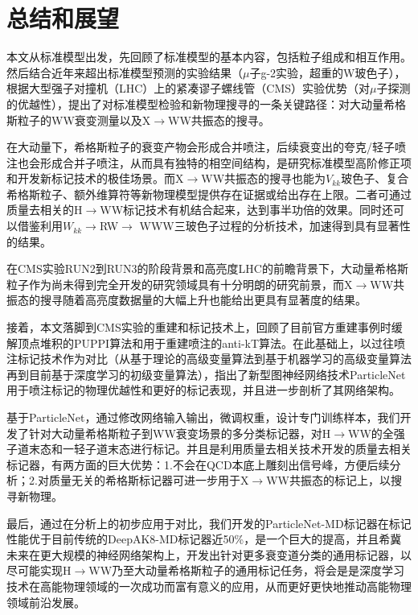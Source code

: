\chapter{总结和展望}
\fontsize{12bp}{14.4pt}

本文从标准模型出发，先回顾了标准模型的基本内容，包括粒子组成和相互作用。然后结合近年来超出标准模型预测的实验结果（$\mu$子g-2实验，超重的W玻色子），根据大型强子对撞机（LHC）上的紧凑谬子螺线管（CMS）实验优势（对$\mu$子探测的优越性），提出了对标准模型检验和新物理搜寻的一条关键路径：对大动量希格斯粒子的WW衰变测量以及X$\to$WW共振态的搜寻。

在大动量下，希格斯粒子的衰变产物会形成合并喷注，后续衰变出的夸克/轻子喷注也会形成合并子喷注，从而具有独特的相空间结构，是研究标准模型高阶修正项和开发新标记技术的极佳场景。而X$\to$WW共振态的搜寻也能为$V_{kk}$玻色子、复合希格斯粒子、额外维算符等新物理模型提供存在证据或给出存在上限。二者可通过质量去相关的H$\to$WW标记技术有机结合起来，达到事半功倍的效果。同时还可以借鉴利用$W_{kk}\to $RW$\to$ WWW三玻色子过程的分析技术，加速得到具有显著性的结果。

在CMS实验RUN2到RUN3的阶段背景和高亮度LHC的前瞻背景下，大动量希格斯粒子作为尚未得到完全开发的研究领域具有十分明朗的研究前景，而X$\to$WW共振态的搜寻随着高亮度数据量的大幅上升也能给出更具有显著度的结果。

接着，本文落脚到CMS实验的重建和标记技术上，回顾了目前官方重建事例时缓解顶点堆积的PUPPI算法和用于重建喷注的anti-kT算法。在此基础上，以过往喷注标记技术作为对比（从基于理论的高级变量算法到基于机器学习的高级变量算法再到目前基于深度学习的初级变量算法），指出了新型图神经网络技术ParticleNet用于喷注标记的物理优越性和更好的标记表现，并且进一步剖析了其网络架构。

基于ParticleNet，通过修改网络输入输出，微调权重，设计专门训练样本，我们开发了针对大动量希格斯粒子到WW衰变场景的多分类标记器，对H$\to$WW的全强子道末态和一轻子道末态进行标记。并且是利用质量去相关技术开发的质量去相关标记器，有两方面的巨大优势：1.不会在QCD本底上雕刻出信号峰，方便后续分析；2.对质量无关的希格斯标记器可进一步用于X$\to$WW共振态的标记上，以搜寻新物理。

最后，通过在分析上的初步应用于对比，我们开发的ParticleNet-MD标记器在标记性能优于目前传统的DeepAK8-MD标记器近50\%，是一个巨大的提高，并且希冀未来在更大规模的神经网络架构上，开发出针对更多衰变道分类的通用标记器，以尽可能实现H$\to$WW乃至大动量希格斯粒子的通用标记任务，将会是是深度学习技术在高能物理领域的一次成功而富有意义的应用，从而更好更快地推动高能物理领域前沿发展。